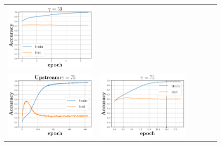 \begin{figure}[h]
\begin{minipage}{0.99\columnwidth}
{\begin{tabular}{cccccc}
\includegraphics[scale=0.125]{figs/galu_50_recovered.pdf}
\\
\includegraphics[scale=0.125]{figs/relu_75.pdf}&
\includegraphics[scale=0.125]{figs/galu_75_good.pdf}&

\end{tabular}}
\end{minipage}
\end{figure}
